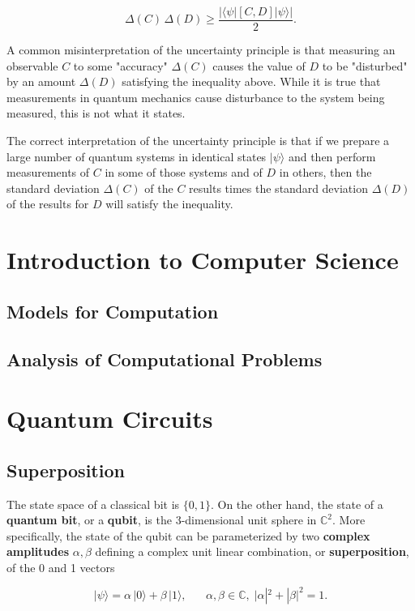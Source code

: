 \documentclass{article}
\theoremstyle{definition}
\begin{document}
      \[\Delta (C) \, \Delta (D) \geq \frac{|\langle \psi |[C, D] | \psi \rangle|}{2}.\]

    A common misinterpretation of the uncertainty principle is that measuring an observable $C$ to some "accuracy" $\Delta (C)$ causes the value of $D$ to be "disturbed" by an amount $\Delta (D)$ satisfying the inequality above. While it is true that measurements in quantum mechanics cause disturbance to the system being measured, this is not what it states.

    The correct interpretation of the uncertainty principle is that if we prepare a large number of quantum systems in identical states $|\psi \rangle$ and then perform measurements of $C$ in some of those systems and of $D$ in others, then the standard deviation $\Delta (C)$ of the $C$ results times the standard deviation $\Delta(D)$ of the results for $D$ will satisfy the inequality.

\section{Introduction to Computer Science}

  \subsection{Models for Computation}
  
  \subsection{Analysis of Computational Problems}

\section{Quantum Circuits}

  \subsection{Superposition}

    The state space of a classical bit is $\{0, 1\}$. On the other hand, the state of a \textbf{quantum bit}, or a \textbf{qubit}, is the 3-dimensional unit sphere in $\mathbb{C}^2$. More specifically, the state of the qubit can be parameterized by two \textbf{complex amplitudes} $\alpha, \beta$ defining a complex unit linear combination, or \textbf{superposition}, of the 0 and 1 vectors

    \[|\psi \rangle = \alpha \,|0 \rangle + \beta \, | 1\rangle, \;\;\;\;\;\; \alpha, \beta \in \mathbb{C}, \; |\alpha|^2 + |\beta|^2 = 1.\]
\end{document}
